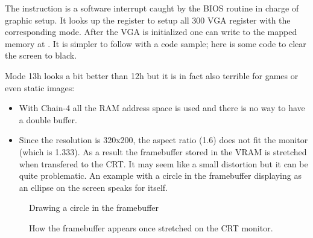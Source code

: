 \documentclass[book.tex]{subfiles}
\begin{document}
  \par
  The  instruction is a software interrupt caught by the BIOS routine in charge of graphic setup. It looks up the  register to setup all 300 VGA register with the corresponding mode. After the VGA is initialized one can write to the mapped memory at . It is simpler to follow with a code sample; here is some code to clear the screen to black.\\
  
  \begin{minipage}{\textwidth}
  
  \end{minipage}
  \par
  Mode 13h looks a bit better than 12h but it is in fact also terrible for games or even static images:\\
  \begin{itemize}
\item With Chain-4 all the RAM address space is used and there is no way to have a double buffer.
\item Since the resolution is 320x200, the aspect ratio (1.6) does not fit the monitor (which is 1.333). As a result the framebuffer stored in the VRAM is stretched when transfered to the CRT. It may seem like a small distortion but it can be quite problematic. An example with a circle in the framebuffer displaying as an ellipse on the screen speaks for itself.
\end{itemize}

\begin{figure}[H]
  \centering
  \caption{Drawing a circle in the framebuffer}
\end{figure}

\begin{figure}[H]
  \centering
  \caption{How the framebuffer appears once stretched on the CRT monitor.}
\end{figure}
\par
\end{document}
